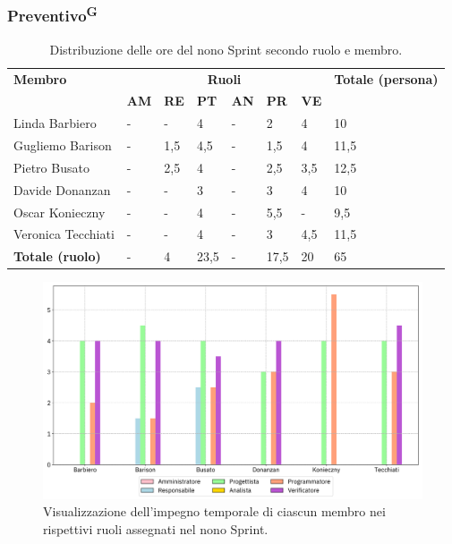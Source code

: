 \documentclass[8pt]{article}
\newcommand{\glossterm}[1]{#1\textsuperscript{G}} %
\begin{document}
\subsubsection{\glossterm{Preventivo}}\begin{table}[ht!]
	\centering
	\begin{tabular}{p{4cm} p{1cm} p{1cm} p{1cm} p{1cm} p{1cm} p{1cm} p{3cm}}
		\toprule
        \textbf{Membro} & \multicolumn{6}{c}{\textbf{Ruoli}} & \textbf{Totale (persona)}\\
		& \textbf{AM} & \textbf{RE} & \textbf{PT} & \textbf{AN} & \textbf{PR} & \textbf{VE}\\
		\midrule
        Linda Barbiero & - & - & 4 & - & 2 & 4 & 10 \\ 
        Gugliemo Barison & - & 1,5 & 4,5 & - & 1,5 & 4 & 11,5 \\ 
        Pietro Busato & - & 2,5 & 4 & - & 2,5 & 3,5 & 12,5 \\ 
        Davide Donanzan & - & - & 3 & - & 3 & 4 & 10 \\ 
        Oscar Konieczny & - & - & 4 & - & 5,5 & - & 9,5 \\ 
        Veronica Tecchiati & - & - & 4 & - & 3 & 4,5 & 11,5 \\
        \midrule
        \textbf{Totale (ruolo)} & - & 4 & 23,5 & - & 17,5 & 20 & 65 \\ 
	\bottomrule
	\end{tabular}
	\caption{Distribuzione delle ore del nono Sprint secondo ruolo e membro.}
	\label{table:Distribuzione delle ore del nono Sprint secondo ruolo e membro}
\end{table}
\begin{figure}[ht!]
    \centering
    \includegraphics[width=15cm]{./images_pdp/istogramma_periodo_9.png}
    \caption{Visualizzazione dell'impegno temporale di ciascun membro nei rispettivi ruoli assegnati
    nel nono Sprint.}
    \label{figure:Visualizzazione dell'impegno temporale di ciascun membro nei rispettivi ruoli
    assegnati nel nono Sprint}
\end{figure}
\end{document}
